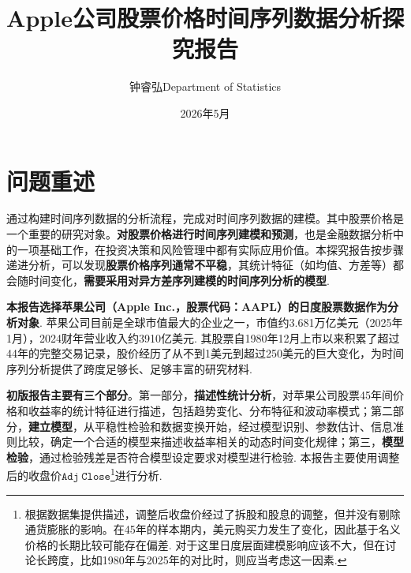 \documentclass[10pt, a4paper]{ctexart}
\theoremstyle{definition}
\numberwithin{equation}{section}
\numberwithin{figure}{section}
\numberwithin{table}{section}
\begin{document}
\title{\heiti {} Apple公司股票价格时间序列数据分析探究报告}
\author{钟睿弘\quad Department of Statistics \\\songti {}}
\date{2026年5月}
\maketitle
\tableofcontents
\thispagestyle{empty}

\clearpage

\section{问题重述}
通过构建时间序列数据的分析流程，完成对时间序列数据的建模。其中股票价格是一个重要的研究对象。\textbf{对股票价格进行时间序列建模和预测}，也是金融数据分析中的一项基础工作，在投资决策和风险管理中都有实际应用价值。本探究报告按步骤递进分析，可以发现\textbf{股票价格序列通常不平稳}，其统计特征（如均值、方差等）都会随时间变化，\textbf{需要采用对异方差序列建模的时间序列分析的模型}.

\textbf{本报告选择苹果公司（Apple Inc.，股票代码：AAPL）的日度股票数据作为分析对象}. 苹果公司目前是全球市值最大的企业之一，市值约3.681万亿美元（2025年1月），2024财年营业收入约3910亿美元. 其股票自1980年12月上市以来积累了超过44年的完整交易记录，股价经历了从不到1美元到超过250美元的巨大变化，为时间序列分析提供了跨度足够长、足够丰富的研究材料.

\textbf{初版报告主要有三个部分}。第一部分，\textbf{描述性统计分析}，对苹果公司股票45年间价格和收益率的统计特征进行描述，包括趋势变化、分布特征和波动率模式；第二部分，\textbf{建立模型}，从平稳性检验和数据变换开始，经过模型识别、参数估计、信息准则比较，确定一个合适的模型来描述收益率相关的动态时间变化规律；第三，\textbf{模型检验}，通过检验残差是否符合模型设定要求对模型进行检验. 本报告主要使用调整后的收盘价$\mathtt{Adj\ Close}$\footnote{根据数据集提供描述，调整后收盘价经过了拆股和股息的调整，但并没有剔除通货膨胀的影响。在45年的样本期内，美元购买力发生了变化，因此基于名义价格的长期比较可能存在偏差. 对于这里日度层面建模影响应该不大，但在讨论长跨度，比如1980年与2025年的对比时，则应当考虑这一因素.}进行分析.




\end{document}
